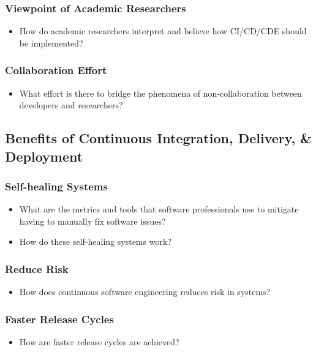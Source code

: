 \documentclass[11pt,a4paper]{article}
\begin{document}
		\subsubsection{Viewpoint of Academic Researchers}
		\begin{itemize}[noitemsep]
			\item How do academic researchers interpret and believe how CI/CD/CDE should be implemented?
		\end{itemize}
		\subsubsection{Collaboration Effort}
		\begin{itemize}[noitemsep]
			\item What effort is there to bridge the phenomena of non-collaboration between developers and researchers?
		\end{itemize}

	\subsection{Benefits of Continuous Integration, Delivery, \& Deployment}
		\subsubsection{Self-healing Systems}
		\begin{itemize}[noitemsep]
			\item What are the metrics and tools that software professionals use to mitigate having to manually fix software issues?
			\item How do these self-healing systems work?
		\end{itemize}
		\subsubsection{Reduce Risk}
		\begin{itemize}[noitemsep]
			\item How does continuous software engineering reduces risk in systems?
		\end{itemize}
		\subsubsection{Faster Release Cycles}
		\begin{itemize}[noitemsep]
			\item How are faster release cycles are achieved?
		\end{itemize}
\end{document}

